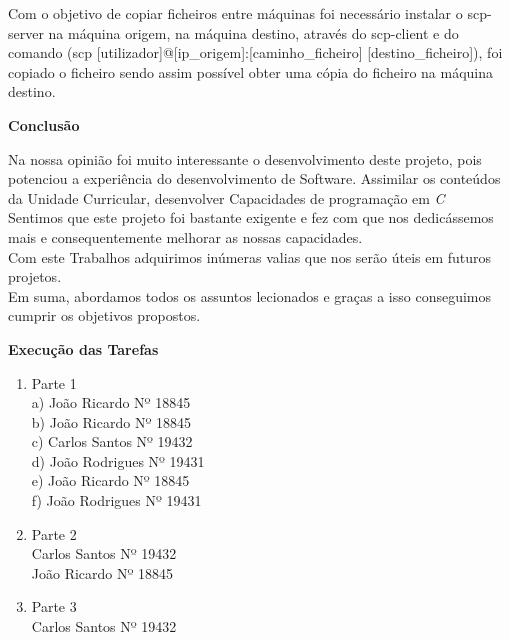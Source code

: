 \documentclass{article}
\begin{document}
	\vspace{1,5 em}
	
	Com o objetivo de copiar ficheiros entre máquinas foi necessário instalar o scp-server na máquina origem, na máquina destino, através do scp-client e do comando
	(scp [utilizador]@[ip\_origem]:[caminho\_ficheiro] [destino\_ficheiro]), foi copiado o ficheiro sendo assim possível obter uma cópia do ficheiro na máquina destino.


	\newpage
	\centerline{\textbf{Conclusão}}
	\vspace{5 em}
	
	Na nossa opinião foi muito interessante o desenvolvimento deste projeto, pois potenciou a experiência do desenvolvimento de Software. Assimilar os conteúdos da Unidade Curricular, desenvolver Capacidades de programação em \textit{C}\\
	
	\vspace{1 em}
	Sentimos que este projeto foi bastante exigente e fez com que nos dedicássemos mais e consequentemente melhorar as nossas capacidades.
	\\
	
	\vspace{1 em}
	Com este Trabalhos adquirimos inúmeras valias que nos serão úteis em futuros projetos.
	\\
	
	\vspace{1 em}
	Em suma, abordamos todos os assuntos lecionados e graças a isso conseguimos cumprir os objetivos propostos.
	\\
	
	\newpage

	\centerline{\textbf{Execução das Tarefas}}
	
	\vspace{3 em}
	\begin{enumerate}
		\item Parte 1 \\
			a) João Ricardo Nº 18845 \\
			b) João Ricardo Nº 18845 \\ 
			c) Carlos Santos Nº 19432 \\
			d) João Rodrigues Nº 19431 \\
			e) João Ricardo Nº 18845  \\
			f) João Rodrigues Nº 19431 \\
		\item Parte 2 \\ Carlos Santos Nº 19432 \\ João Ricardo Nº 18845 
		\item Parte 3 \\ Carlos Santos Nº 19432
	\end{enumerate}
	\vspace{3 em}
	
\end{document}
